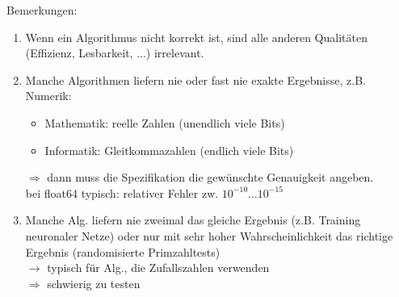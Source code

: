 \documentclass[11pt, fleqn]{scrreprt}
\begin{document}
Bemerkungen:
\begin{enumerate}
    \item Wenn ein Algorithmus nicht korrekt ist, sind alle anderen Qualitäten (Effizienz, Lesbarkeit, ...) irrelevant.
    \item Manche Algorithmen liefern nie oder fast nie exakte Ergebnisse, z.B. Numerik:
    \begin{itemize}
        \item Mathematik: reelle Zahlen (unendlich viele Bits)
        \item Informatik: Gleitkommazahlen (endlich viele Bits)
    \end{itemize}
    $\Rightarrow$ dann muss die Spezifikation die gewünschte Genauigkeit angeben. \\
    bei float64 typisch: relativer Fehler zw. $10^{-10} \dots 10^{-15}$
    \item Manche Alg. liefern nie zweimal das gleiche Ergebnis (z.B. Training neuronaler Netze) oder nur mit sehr hoher Wahrscheinlichkeit das richtige Ergebnis (randomisierte Primzahltests)\\
    $\rightarrow$ typisch für Alg., die Zufallszahlen verwenden \\
    $\Rightarrow$ schwierig zu testen
\end{enumerate}
\end{document}
